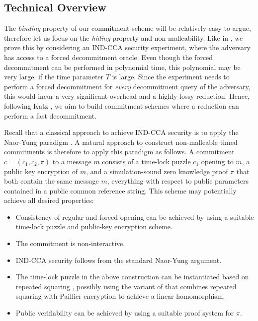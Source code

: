 
\subsection{Technical Overview}\label{sec:techoverview}
The \emph{binding} property of our commitment scheme will be relatively easy to argue, therefore let us focus on the \emph{hiding} property and non-malleability. Like in \cite{TCC:KatLosXu20}, we prove this by considering an IND-CCA security experiment, where the adversary has access to a forced decommitment oracle. 
Even though the forced decommitment can be performed in polynomial time, this polynomial may be very large, if the time parameter $T$ is large. Since the experiment needs to perform a forced decommitment for \emph{every} decommitment query of the adversary, this would incur a very significant overhead and a highly lossy reduction.
Hence, following Katz \etal \cite{TCC:KatLosXu20}, we aim to build commitment schemes where a reduction can perform a fast decommitment. 

Recall that a classical approach to achieve IND-CCA security is to apply the Naor-Yung paradigm \cite{STOC:NaoYun90}. A natural approach to construct non-malleable timed commitments is therefore to apply this paradigm as follows. A commitment $c = (c_1, c_2, \pi)$ to a message $m$ consists of a time-lock puzzle $c_1$ opening to $m$, a public key encryption of $m$, and a simulation-sound zero knowledge proof $\pi$ that both contain the same message $m$, everything with respect to public parameters contained in a public common reference string.
This scheme may potentially achieve all desired properties:
\begin{itemize}
	\item Consistency of regular and forced opening can be achieved by using a suitable time-lock puzzle and public-key encryption scheme. 
	\item The commitment is non-interactive.
	\item IND-CCA security follows from the standard Naor-Yung argument.
	\item The time-lock puzzle in the above construction can be instantiated based on repeated squaring \cite{RSW96}, possibly using the variant of \cite{C:MalThy19} that combines repeated squaring with Paillier encryption \cite{EC:Paillier99} to achieve a linear homomorphism. 
	\item Public verifiability can be achieved by using a suitable proof system for $\pi$.
\end{itemize}

